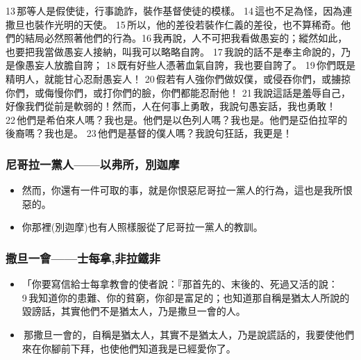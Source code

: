  13 那等人是假使徒，行事詭詐，裝作基督使徒的模樣。 14 這也不足為怪，因為連撒旦也裝作光明的天使。 15 所以，他的差役若裝作仁義的差役，也不算稀奇。他們的結局必然照著他們的行為。16 我再說，人不可把我看做愚妄的；縱然如此，也要把我當做愚妄人接納，叫我可以略略自誇。 17 我說的話不是奉主命說的，乃是像愚妄人放膽自誇； 18 既有好些人憑著血氣自誇，我也要自誇了。 19 你們既是精明人，就能甘心忍耐愚妄人！ 20 假若有人強你們做奴僕，或侵吞你們，或擄掠你們，或侮慢你們，或打你們的臉，你們都能忍耐他！ 21 我說這話是羞辱自己，好像我們從前是軟弱的！然而，人在何事上勇敢，我說句愚妄話，我也勇敢！ 22 他們是希伯來人嗎？我也是。他們是以色列人嗎？我也是。他們是亞伯拉罕的後裔嗎？我也是。 23 他們是基督的僕人嗎？我說句狂話，我更是！
 
 \subsubsection{尼哥拉一黨人——以弗所，別迦摩}
 \begin{itemize}
 \itemsep-.25em
\item 然而，你還有一件可取的事，就是你恨惡尼哥拉一黨人的行為，這也是我所恨惡的。
\item 你那裡(別迦摩)也有人照樣服從了尼哥拉一黨人的教訓。
 \end{itemize} 
 
 \subsubsection{撒旦一會——士每拿,非拉鐵非}
 \begin{itemize}
 \itemsep-.25em
\item  「你要寫信給士每拿教會的使者說：『那首先的、末後的、死過又活的說： 9 我知道你的患難、你的貧窮，你卻是富足的；也知道那自稱是猶太人所說的毀謗話，其實他們不是猶太人，乃是撒旦一會的人。
\item  那撒旦一會的，自稱是猶太人，其實不是猶太人，乃是說謊話的，我要使他們來在你腳前下拜，也使他們知道我是已經愛你了。
 \end{itemize}
 
 
